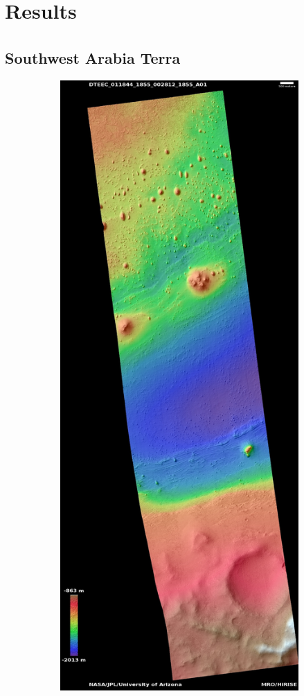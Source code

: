 \documentclass[12pt]{article}
\newcommand{\supcite}[1]{\textsuperscript{\cite{#1}}}
\begin{document}
\section{Results}
\label{sec:results}
\subsection{Southwest Arabia Terra\supcite{bib:ESP_011844_1855}}
\label{sub:southwest_arabia_terra}
\begin{figure}[h!]
  \centering
  \begin{subfigure}[t]{0.27\textwidth}
    \centering
    \includegraphics[height=0.4\paperheight]{figures/maps/ESP_011844_1855/DTEEC_011844_1855_002812_1855_A01.jpg}

\end{subfigure}
\end{figure}
\end{document}
